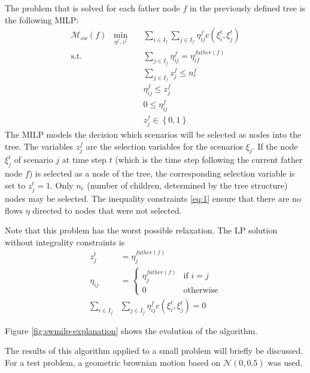 The problem that is solved for each father node $f$ in the previously defined tree is the following MILP:
\begin{subequations}
\begin{eqnarray} %
  \label{eq:small-milp-in-alg}
  \mathcal{M}_{sw}(f)\; \; \min_{\eta^f,z^f}&&\sum_{i\in I_f}\sum_{j\in I_f}\eta_{ij}^fc(\xi_i^t,\xi_j^t)\\
  \mathrm{s.t.}&&\sum_{j\in I_f}\eta_{ij}^f = \eta_{if}^{father(f)}\\
  \label{eq:75}
  &&\sum_{j\in I_f}z_j^f \leq n_c^f\\
  \label{eq:1}
  &&\eta_{ij}^f\leq z_j^f\\
  &&0\leq \eta_{ij}^f\\
  &&z_j^f\in\left\{0,1\right\}
\end{eqnarray}
\end{subequations}
The MILP models the decision which scenarios will be selected as nodes into the tree.
The variables $z_j^f$ are the selection variables for the scenarios $\xi_j$.
If the node $\xi_j^t$ of scenario $j$ at time step $t$ (which is the time step following the current father node $f$) is selected as a node of the tree, the corresponding selection variable is set to $z_j^t=1$.
Only $n_c$ (number of children, determined by the tree structure) nodes may be selected.
The inequality constraints \eqref{eq:1} ensure that there are no flows $\eta$ directed to nodes that were not selected.

Note that this problem has the worst possible relaxation. The LP solution without integrality constraints is
\begin{subequations}
\begin{align}
  \label{eq:2}
  z_j^t &= \eta_j^{father(f)}\\
  \eta_{ij} &= \left\{
    \begin{array}{ll}
      \eta_j^{father(f)}&\text{if } i=j\\
      0&\text{otherwise}
    \end{array}
  \right.\\
  \sum_{i\in I_f}&\sum_{j\in I_f}\eta_{ij}^fc(\xi_i^t,\xi_j^t) = 0
\end{align}
\end{subequations}

Figure \ref{fig:swmilp-explanation} shows the evolution of the algorithm.

The results of this algorithm applied to a small problem will briefly be discussed.
For a test problem, a geometric brownian motion based on $\mathcal{N}(0,0.5)$ was used.

